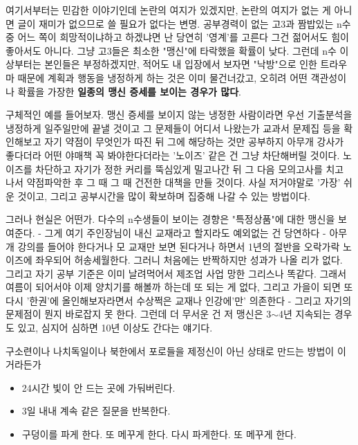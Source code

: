 여기서부터는 민감한 이야기인데 논란의 여지가 있겠지만, 논란의 여지가 없는 게 아니면 글이 재미가 없으므로 쓸 필요가 없다는 변명.
공부경력이 없는 고3과 짬밥있는 n수 중 어느 쪽이 희망적이냐하고 하겠냐면 난 당연히 '영계'를 고른다
그건 젊어서도 힘이 좋아서도 아니다. 그냥 고3들은 최소한 "맹신"에 타락했을 확률이 낮다.
그런데 n수 이상부터는 본인들은 부정하겠지만, 적어도 내 입장에서 보자면 "낙방"으로 인한 트라우마 때문에
계획과 행동을 냉정하게 하는 것은 이미 물건너갔고, 오히려 어떤 객관성이나 확률을 가장한 \textbf{일종의 맹신 증세를 보이는 경우가 많다}.
\vspace{5mm}

구체적인 예를 들어보자.
맹신 증세를 보이지 않는 냉정한 사람이라면 우선 기출분석을 냉정하게 일주일만에 끝낼 것이고
그 문제들이 어디서 나왔는가 교과서 문제집 등을 확인해보고 자기 약점이 무엇인가 따진 뒤 그에 해당하는 것만 공부하지
아무개 강사가 좋다더라 어떤 야매책 꼭 봐야한다더라는 '노이즈' 같은 건 그냥 차단해버릴 것이다.
노이즈를 차단하고 자기가 정한 커리를 뚝심있게 밀고나간 뒤 그 다음 모의고사를 치고 나서 약점파악한 후 그 때 그 때 건전한 대책을 만들 것이다.
사실 저거야말로 '가장' 쉬운 것이고, 그리고 공부시간을 많이 확보하며 집중해 나갈 수 있는 방법이다.
\vspace{5mm}

그러나 현실은 어떤가. 다수의 n수생들이 보이는 경향은 "특정상품"에 대한 맹신을 보여준다.
- 그게 여기 주인장님이 내신 교재라고 할지라도 예외없는 건 당연하다 -
아무개 강의를 들어야 한다거나 모 교재만 보면 된다거나 하면서 1년의 절반을 오락가락 노이즈에 좌우되어 허송세월한다.
그러니 처음에는 반짝하지만 성과가 나올 리가 없다. 그리고 자기 공부 기준은 이미 날려먹어서 제조업 사업 망한 그리스나 똑같다.
그래서 여름이 되어서야 이제 양치기를 해볼까 하는데 또 되는 게 없다, 그리고 가을이 되면 또 다시 '한권'에 올인해보자라면서
수상쩍은 교재나 인강에'만' 의존한다 - 그리고 자기의 문제점이 뭔지 바로잡지 못 한다.
그런데 더 무서운 건 저 맹신은 3$\sim$4년 지속되는 경우도 있고, 심지어 심하면 10년 이상도 간다는 얘기다.
\vspace{5mm}

구소련이나 나치독일이나 북한에서 포로들을 제정신이 아닌 상태로 만드는 방법이 이거라든가

\begin{itemize}
    \item  24시간 빛이 안 드는 곳에 가둬버린다.
    \item  3일 내내 계속 같은 질문을 반복한다.
    \item  구덩이를 파게 한다. 또 메꾸게 한다. 다시 파게한다. 또 메꾸게 한다.
\end{itemize}
\vspace{5mm}

